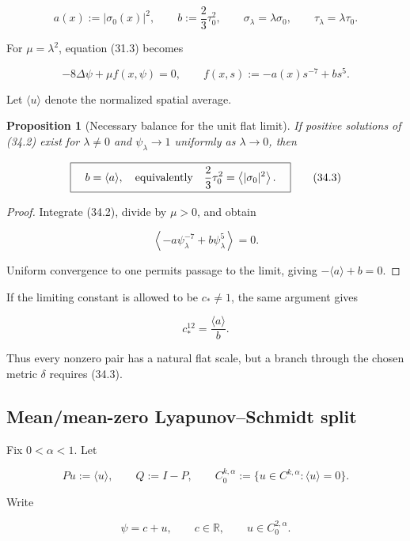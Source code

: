 \documentclass[11pt]{article}
\newtheorem{proposition}[theorem]{Proposition}
\theoremstyle{remark}
\begin{document}
\[
 a(x):=|\sigma_0(x)|^2,\qquad
 b:=\frac23\tau_0^2,\qquad
 \sigma_\lambda=\lambda\sigma_0,\qquad
 \tau_\lambda=\lambda\tau_0.                                 \tag{34.1}
\]

For \(\mu=\lambda^2\), equation (31.3) becomes

\[
 -8\Delta\psi+\mu f(x,\psi)=0,\qquad
 f(x,s):=-a(x)s^{-7}+bs^5.                                   \tag{34.2}
\]

Let \(\langle u\rangle\) denote the normalized spatial average.

\begin{proposition}[Necessary balance for the unit flat limit]
\label{prop:v19v31-necessary}
If positive solutions of (34.2) exist for \(\lambda\neq0\) and
\(\psi_\lambda\to1\) uniformly as \(\lambda\to0\), then

\[
 \boxed{\quad b=\langle a\rangle,\quad\hbox{equivalently}\quad
 \frac23\tau_0^2=\left\langle|\sigma_0|^2\right\rangle.\quad}  \tag{34.3}
\]
\end{proposition}

\begin{proof}
Integrate (34.2), divide by \(\mu>0\), and obtain

\[
 \left\langle-a\psi_\lambda^{-7}
 +b\psi_\lambda^5\right\rangle=0.                            \tag{34.4}
\]

Uniform convergence to one permits passage to the limit, giving
\(-\langle a\rangle+b=0\).
\end{proof}

If the limiting constant is allowed to be \(c_*\neq1\), the same argument
gives

\[
 c_*^{12}=\frac{\langle a\rangle}{b}.                         \tag{34.5}
\]

Thus every nonzero pair has a natural flat scale, but a branch through
the chosen metric \(\delta\) requires (34.3).

\subsection{Mean/mean-zero Lyapunov--Schmidt split}

Fix \(0<\alpha<1\).  Let

\[
 P u:=\langle u\rangle,\qquad Q:=I-P,\qquad
 C^{k,\alpha}_0:=\{u\in C^{k,\alpha}:\langle u\rangle=0\}.     \tag{34.6}
\]

Write

\[
 \psi=c+u,\qquad c\in\mathbb R,\qquad u\in C^{2,\alpha}_0.    \tag{34.7}
\]
\end{document}
